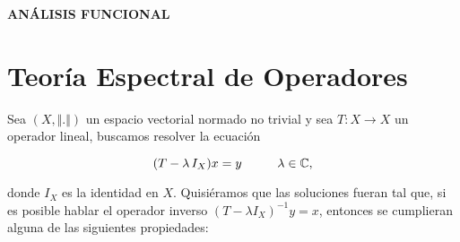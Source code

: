 \documentclass[letterpaper]{report}
\newcommand{\co}{\ensuremath{\mathbb C }}
\begin{document}
\begin{titlepage}
\begin{center}



\LARGE\textbf{ANÁLISIS FUNCIONAL}







\tableofcontents
 
\end{center}
\end{titlepage} 

\chapter{Teoría Espectral de Operadores}

\noindent Sea $(X,\Vert.\Vert)$ un espacio vectorial normado no trivial y sea $T:X\rightarrow X$ un operador lineal, buscamos resolver la ecuación

\begin{equation}
(T-\lambda\,I_X)x=y \hspace*{1cm} \lambda\in\co,
\end{equation}

\noindent donde $I_X$ es la identidad en $X$. Quisiéramos que las soluciones fueran tal que, si es posible hablar el operador inverso $(T-\lambda I_X)^{-1}y=x$, entonces se cumplieran alguna de las siguientes propiedades: 
\end{document}
